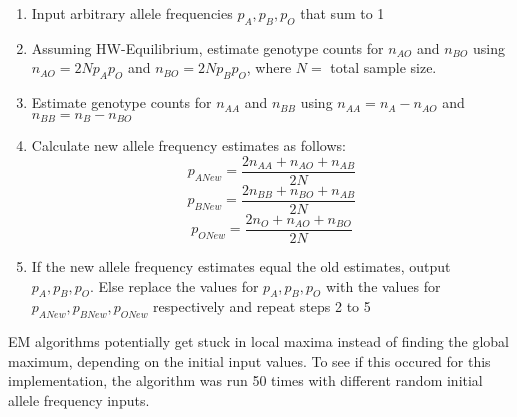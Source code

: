 \documentclass{article}
\begin{document}
	\begin{enumerate}
		\item Input arbitrary allele frequencies $p_A, p_B, p_O$ that sum to 1
		\item Assuming HW-Equilibrium, estimate genotype counts for $n_{AO}$ and $n_{BO}$ using $n_{AO} = 2Np_Ap_O$ and $n_{BO} = 2Np_Bp_O$, where $N =$ total sample size.
		\item Estimate genotype counts for $n_{AA}$ and $n_{BB}$ using $n_{AA} = n_{A} - n_{AO}$ and $n_{BB} = n_{B} - n_{BO}$
		\item Calculate new allele frequency estimates as follows:
		\[p_{ANew} = \frac{2n_{AA} + n_{AO} + n_{AB}}{2N}\]
		\[p_{BNew} = \frac{2n_{BB} + n_{BO} + n_{AB}}{2N}\]		
		\[p_{ONew} = \frac{2n_{O} + n_{AO} + n_{BO}}{2N}\]	
		\item If the new allele frequency estimates equal the old estimates,	output $p_A, p_B, p_O$. Else replace the values for $p_A, p_B, p_O$ with the values for $p_{ANew}, p_{BNew}, p_{ONew}$ respectively and repeat steps 2 to 5
		
	\end{enumerate}

	EM algorithms potentially get stuck in local maxima instead of finding the global maximum, depending on the initial input values. To see if this occured for this implementation, the algorithm was run 50 times with different random initial allele frequency inputs.
\end{document}
